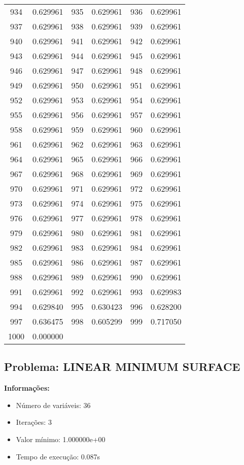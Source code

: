 \documentclass[12pt]{article}
\begin{document}
\begin{longtable}{@{}cc|cc|cc@{}}
934 & 0.629961 & 935 & 0.629961 & 936 & 0.629961 \\
937 & 0.629961 & 938 & 0.629961 & 939 & 0.629961 \\
940 & 0.629961 & 941 & 0.629961 & 942 & 0.629961 \\
943 & 0.629961 & 944 & 0.629961 & 945 & 0.629961 \\
946 & 0.629961 & 947 & 0.629961 & 948 & 0.629961 \\
949 & 0.629961 & 950 & 0.629961 & 951 & 0.629961 \\
952 & 0.629961 & 953 & 0.629961 & 954 & 0.629961 \\
955 & 0.629961 & 956 & 0.629961 & 957 & 0.629961 \\
958 & 0.629961 & 959 & 0.629961 & 960 & 0.629961 \\
961 & 0.629961 & 962 & 0.629961 & 963 & 0.629961 \\
964 & 0.629961 & 965 & 0.629961 & 966 & 0.629961 \\
967 & 0.629961 & 968 & 0.629961 & 969 & 0.629961 \\
970 & 0.629961 & 971 & 0.629961 & 972 & 0.629961 \\
973 & 0.629961 & 974 & 0.629961 & 975 & 0.629961 \\
976 & 0.629961 & 977 & 0.629961 & 978 & 0.629961 \\
979 & 0.629961 & 980 & 0.629961 & 981 & 0.629961 \\
982 & 0.629961 & 983 & 0.629961 & 984 & 0.629961 \\
985 & 0.629961 & 986 & 0.629961 & 987 & 0.629961 \\
988 & 0.629961 & 989 & 0.629961 & 990 & 0.629961 \\
991 & 0.629961 & 992 & 0.629961 & 993 & 0.629983 \\
994 & 0.629840 & 995 & 0.630423 & 996 & 0.628200 \\
997 & 0.636475 & 998 & 0.605299 & 999 & 0.717050 \\
1000 & 0.000000 &  &  &  &  \\

\end{longtable}


\newpage            
\subsection{Problema: LINEAR MINIMUM SURFACE}

\textbf{Informações:}
\begin{itemize}
\item Número de variáveis: 36
\item Iterações: 3
\item Valor mínimo: 1.000000e+00
\item Tempo de execução: 0.087s
\end{itemize}
\end{document}
